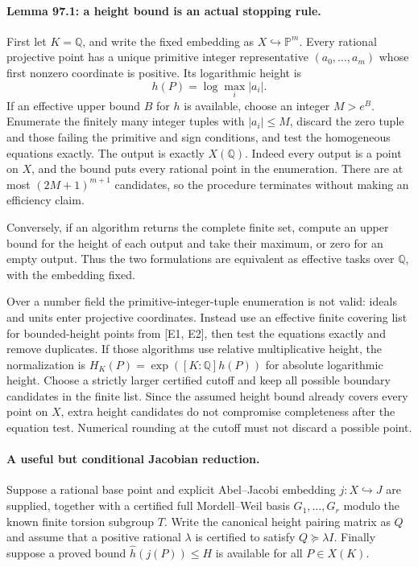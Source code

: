 \documentclass[11pt]{article}
\begin{document}
\paragraph{Lemma 97.1: a height bound is an actual stopping rule.}
First let $K=\mathbb Q$, and write the fixed embedding as
$X\hookrightarrow\mathbb P^m$. Every rational projective point has a
unique primitive integer representative $(a_0,\ldots,a_m)$ whose first
nonzero coordinate is positive. Its logarithmic height is
\[
                         h(P)=\log\max_i|a_i|.
\]
If an effective upper bound $B$ for $h$ is available, choose an integer
$M>e^B$. Enumerate the finitely many integer tuples with
$|a_i|\le M$, discard the zero tuple and those failing the primitive
and sign conditions, and test the homogeneous equations exactly.
The output is exactly $X(\mathbb Q)$. Indeed every output is a point
on $X$, and the bound puts every rational point in the enumeration.
There are at most $(2M+1)^{m+1}$ candidates, so the procedure terminates
without making an efficiency claim.

Conversely, if an algorithm returns the complete finite set, compute
an upper bound for the height of each output and take their maximum,
or zero for an empty output. Thus the two formulations are equivalent
as effective tasks over $\mathbb Q$, with the embedding fixed.

Over a number field the primitive-integer-tuple enumeration is not
valid: ideals and units enter projective coordinates. Instead use an
effective finite covering list for bounded-height points from [E1,
E2], then test the equations exactly and remove duplicates. If those
algorithms use relative multiplicative height, the normalization is
$H_K(P)=\exp([K:\mathbb Q]h(P))$ for absolute logarithmic height.
Choose a strictly larger certified cutoff and keep all possible
boundary candidates in the finite list. Since the assumed height
bound already covers every point on $X$, extra height candidates do
not compromise completeness after the equation test. Numerical
rounding at the cutoff must not discard a possible point.

\paragraph{A useful but conditional Jacobian reduction.}
Suppose a rational base point and explicit Abel--Jacobi embedding
$j:X\hookrightarrow J$ are supplied, together with a certified full
Mordell--Weil basis $G_1,\ldots,G_r$ modulo the known finite torsion
subgroup $T$. Write the canonical height pairing matrix as $Q$ and
assume that a positive rational $\lambda$ is certified to satisfy
$Q\succeq\lambda I$. Finally suppose a proved bound
$\widehat h(j(P))\le H$ is available for all $P\in X(K)$.
\end{document}
